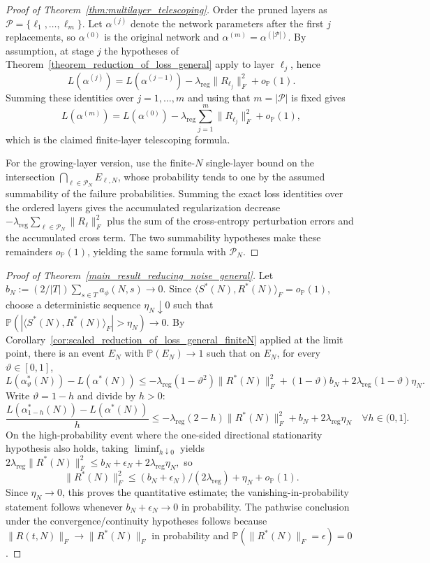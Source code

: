 \documentclass[11pt]{article}
\theoremstyle{plain}
\theoremstyle{definition}
\theoremstyle{remark}
\newcommand{\PP}{\mathbb{P}}
\newcommand{\1}{\mathbf{1}}
\begin{document}
\begin{proof}[Proof of Theorem~\ref{thm:multilayer_telescoping}]
Order the pruned layers as \(\mathcal P=\{\ell_1,\dots,\ell_m\}\). Let \(\alpha^{(j)}\) denote the network parameters after the first \(j\) replacements, so \(\alpha^{(0)}\) is the original network and \(\alpha^{(m)}=\alpha^{(|\mathcal P|)}\). By assumption, at stage \(j\) the hypotheses of Theorem~\ref{theorem_reduction_of_loss_general} apply to layer \(\ell_j\), hence
\[
L(\alpha^{(j)})
=
L(\alpha^{(j-1)})-\lambda_{\mathrm{reg}}\|R_{\ell_j}\|_F^2+o_{\PP}(1).
\]
Summing these identities over \(j=1,\dots,m\) and using that \(m=|\mathcal P|\) is fixed gives
\[
L(\alpha^{(m)})
=
L(\alpha^{(0)})-\lambda_{\mathrm{reg}}\sum_{j=1}^{m}\|R_{\ell_j}\|_F^2+o_{\PP}(1),
\]
which is the claimed finite-layer telescoping formula.

For the growing-layer version, use the finite-\(N\) single-layer bound on the intersection \(\bigcap_{\ell\in\mathcal P_N}E_{\ell,N}\), whose probability tends to one by the assumed summability of the failure probabilities. Summing the exact loss identities over the ordered layers gives the accumulated regularization decrease \(-\lambda_{\mathrm{reg}}\sum_{\ell\in\mathcal P_N}\|R_\ell\|_F^2\) plus the sum of the cross-entropy perturbation errors and the accumulated cross term. The two summability hypotheses make these remainders \(o_{\PP}(1)\), yielding the same formula with \(\mathcal P_N\).
\end{proof}

\begin{proof}[Proof of Theorem~\ref{main_result_reducing_noise_general}]
Let \(b_N:=(2/|T|)\sum_{s\in T}a_\phi(N,s)\to0\).
Since \(\langle S^*(N),R^*(N)\rangle_F=o_{\PP}(1)\), choose a deterministic sequence \(\eta_N\downarrow0\) such that \(\PP(|\langle S^*(N),R^*(N)\rangle_F|>\eta_N)\to0\).
By Corollary~\ref{cor:scaled_reduction_of_loss_general_finiteN} applied at the limit point, there is an event \(E_N\) with \(\PP(E_N)\to1\) such that on \(E_N\), for every \(\vartheta\in[0,1]\),
\[
L(\alpha_\vartheta^*(N))-L(\alpha^*(N))
\le
-\lambda_{\mathrm{reg}}(1-\vartheta^2)\|R^*(N)\|_F^2
+(1-\vartheta)b_N
+2\lambda_{\mathrm{reg}}(1-\vartheta)\eta_N.
\]
Write \(\vartheta=1-h\) and divide by \(h>0\):
\[
\frac{L(\alpha_{1-h}^*(N))-L(\alpha^*(N))}{h}
\le
-\lambda_{\mathrm{reg}}(2-h)\|R^*(N)\|_F^2
+b_N+2\lambda_{\mathrm{reg}}\eta_N
\quad\forall h\in(0,1].
\]
On the high-probability event where the one-sided directional stationarity hypothesis also holds, taking \(\liminf_{h\downarrow0}\) yields
\(
2\lambda_{\mathrm{reg}}\|R^*(N)\|_F^2
\le
b_N+\epsilon_N+2\lambda_{\mathrm{reg}}\eta_N,
\)
so
\[
\|R^*(N)\|_F^2
\le
(b_N+\epsilon_N)/(2\lambda_{\mathrm{reg}})+\eta_N+o_{\PP}(1).
\]
Since \(\eta_N\to0\), this proves the quantitative estimate; the vanishing-in-probability statement follows whenever \(b_N+\epsilon_N\to0\) in probability. The pathwise conclusion under the convergence/continuity hypotheses follows because \(\|R(t,N)\|_F\to\|R^*(N)\|_F\) in probability and \(\PP(\|R^*(N)\|_F=\epsilon)=0\).
\end{proof}



\end{document}
